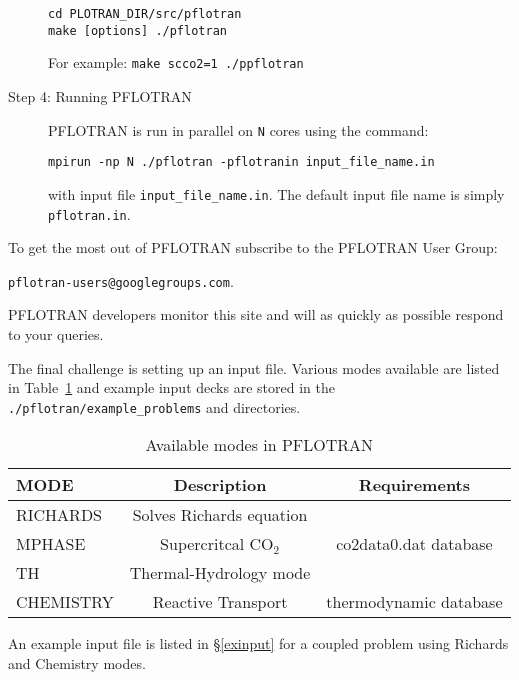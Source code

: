 \begin{description}
\begin{table}[H]
\end{table}

\footnotesize
\begin{Verbatim}
cd PLOTRAN_DIR/src/pflotran
make [options] ./pflotran
\end{Verbatim}
\normalsize

For example: {\footnotesize\tt make scco2=1 ./ppflotran}

\item[Step 4: Running PFLOTRAN] PFLOTRAN is run in parallel on {\tt N} cores using the command:

{\footnotesize\tt mpirun -np N ./pflotran -pflotranin input\_file\_name.in}

with input file {\footnotesize\tt input\_file\_name.in}. The default input file name is simply {\footnotesize\tt pflotran.in}.
\end{description}

\noindent
To get the most out of PFLOTRAN subscribe to the PFLOTRAN User Group:

{\footnotesize\tt pflotran-users@googlegroups.com}.

\noindent
PFLOTRAN developers monitor this site and will as quickly as possible respond to your queries.

The final challenge is setting up an input file. Various modes available are listed in Table~\ref{tmodes} and example input decks are stored in the {\footnotesize\tt ./pflotran/example\_problems} and  directories.

\begin{table}[H]\centering
\caption{Available modes in PFLOTRAN}
\label{tmodes}
\vspace{3mm}
\begin{tabular}{lcc}
\toprule
MODE & \multicolumn{1}{c}{Description} & Requirements\\
\midrule
RICHARDS & Solves Richards equation & \\
MPHASE & Supercritcal CO$_2$ & co2data0.dat database\\
TH & Thermal-Hydrology mode & \\
CHEMISTRY & Reactive Transport & thermodynamic database\\
\bottomrule
\end{tabular}
\end{table}

An example input file is listed in \S\ref{exinput} for a coupled problem using Richards and Chemistry modes.

